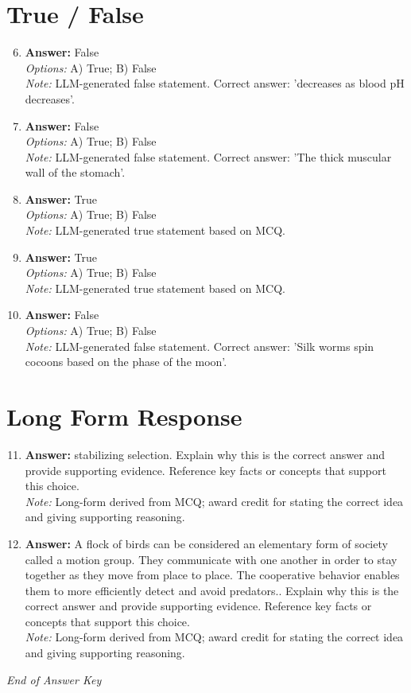 \documentclass[12pt]{article}
\begin{document}
\section*{True / False}
\begin{enumerate}[label=\arabic*.]
\setcounter{enumi}{5}
\item \textbf{Answer:} False
\\ \textit{Options:} A) True; B) False
\\ \textit{Note:} LLM-generated false statement. Correct answer: 'decreases as blood pH decreases'.
\item \textbf{Answer:} False
\\ \textit{Options:} A) True; B) False
\\ \textit{Note:} LLM-generated false statement. Correct answer: 'The thick muscular wall of the stomach'.
\item \textbf{Answer:} True
\\ \textit{Options:} A) True; B) False
\\ \textit{Note:} LLM-generated true statement based on MCQ.
\item \textbf{Answer:} True
\\ \textit{Options:} A) True; B) False
\\ \textit{Note:} LLM-generated true statement based on MCQ.
\item \textbf{Answer:} False
\\ \textit{Options:} A) True; B) False
\\ \textit{Note:} LLM-generated false statement. Correct answer: 'Silk worms spin cocoons based on the phase of the moon'.
\end{enumerate}

\section*{Long Form Response}
\begin{enumerate}[label=\arabic*.]
\setcounter{enumi}{10}
\item \textbf{Answer:} stabilizing selection. Explain why this is the correct answer and provide supporting evidence. Reference key facts or concepts that support this choice.
\\ \textit{Note:} Long-form derived from MCQ; award credit for stating the correct idea and giving supporting reasoning.
\item \textbf{Answer:} A flock of birds can be considered an elementary form of society called a motion group. They communicate with one another in order to stay together as they move from place to place. The cooperative behavior enables them to more efficiently detect and avoid predators.. Explain why this is the correct answer and provide supporting evidence. Reference key facts or concepts that support this choice.
\\ \textit{Note:} Long-form derived from MCQ; award credit for stating the correct idea and giving supporting reasoning.
\end{enumerate}

\vfill
\noindent\textit{End of Answer Key}
\end{document}
